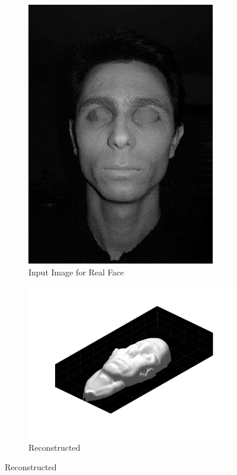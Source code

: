\noindent
\begin{center}
	\begin{figure}
		\begin{subfigure}{0.5\textwidth}
			\centering
			\includegraphics[scale = 0.35]{Images/realface/gleb_closed.png}
			\caption{Input Image for Real Face}
		\end{subfigure}
		\begin{subfigure}{0.5\textwidth}
			\centering
			\includegraphics[scale = 0.2]{Images/realface/gleb_closed.jpg}
			\caption{Reconstructed}
		\end{subfigure}

\end{figure}
\end{center}
